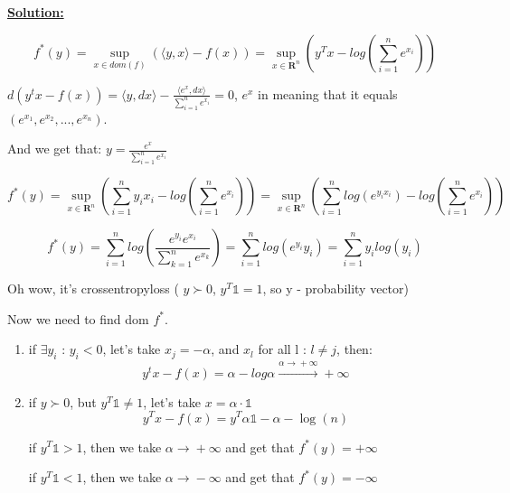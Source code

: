 \underline{\textbf{Solution:}}

\begin{equation*}
    f^*(y) = \sup_{x \in dom(f)} \left( 
    \langle y, x \rangle - f(x) \right) = \sup_{x \in \mathbf{R}^n} \left( y^Tx - log \left( \sum\limits_{i=1}^n e^{x_i}\right)
    \right)
\end{equation*}

$d(y^tx - f(x)) = \langle y, dx \rangle - \frac{\langle e^x, dx \rangle}{\sum\limits_{i=1}^n e^{x_i}}=0$,  $e^x$ in meaning that it equals $(e^{x_1}, e^{x_2}, ..., e^{x_n})$.

And we get that: $y = \frac{e^x}{\sum\limits_{i=1}^n e^{x_i}}$

\begin{equation*}
    f^*(y) = \sup_{x \in \mathbf{R}^n} \left(\sum\limits_{i=1}^n y_ix_i - log \left( \sum\limits_{i=1}^n e^{x_i}\right) \right) = \sup_{x \in \mathbf{R}^n} \left(\sum\limits_{i=1}^n log(e^{y_ix_i}) - log \left( \sum\limits_{i=1}^n e^{x_i}\right) \right) 
\end{equation*}

\begin{equation*}
    f^*(y) = \sum\limits_{i=1}^n log \left( \frac{e^{y_i}e^{x_i}}{\sum\limits_{k=1}^n e^{x_k}} \right) = \sum\limits_{i=1}^n log \left( e^{y_i}y_i \right) = \sum\limits_{i=1}^n y_i log(y_i) 
\end{equation*}

Oh wow, it's crossentropyloss ( $y \succ 0$, $y^T\mathds{1} = 1$, so y - probability vector)

Now we need to find dom $f^*$. 
\begin{enumerate}
    \item if $\exists y_i$ : $y_i < 0$, let's take $x_j = -\alpha$, and $x_l$ for all l : $l \not = j$, then:
    \begin{equation*}
    y^tx - f(x) = \alpha - log \alpha \xrightarrow{\alpha \xrightarrow{} +\infty} +\infty    
    \end{equation*}

    \item if $y \succ 0$, but $y^T \mathds{1} \not = 1$, let's take $x = \alpha \cdot \mathds{1}$
    \begin{equation*}
    y^Tx - f(x) = y^T\alpha\mathds{1} - \alpha  - \log(n)
    \end{equation*}
    
    if $y^T \mathds{1} > 1$, then we take $\alpha \xrightarrow{} +\infty$ and get that $f^*(y) = +\infty$

    if $y^T\mathds{1} < 1$, then we take $\alpha \xrightarrow{} -\infty$ and get that $f^*(y) = -\infty$
\end{enumerate}

